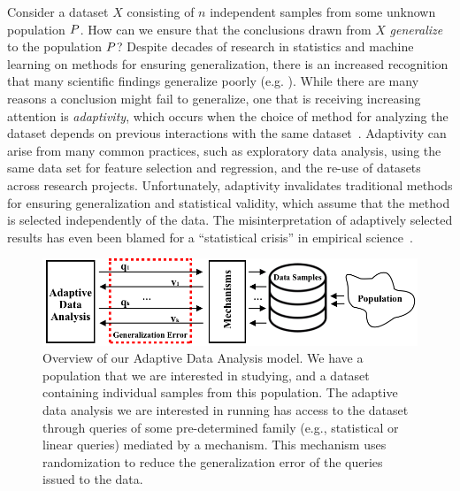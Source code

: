 Consider a dataset $X$ consisting of $n$ independent samples from some unknown population $P$.  How can we ensure that the conclusions drawn from $X$ \emph{generalize} to the population $P$?  Despite decades of research in statistics and machine learning on methods for ensuring generalization, there is an increased recognition that many scientific findings generalize poorly (e.g. 
\cite{Ioannidis05,GelmanL13}). While there are many reasons a conclusion might fail to generalize, one that is receiving increasing attention is \emph{adaptivity}, which occurs when the choice of method for analyzing the dataset depends on previous interactions with the same dataset~\cite{GelmanL13}.
%
 Adaptivity can arise from many common practices, such as exploratory data analysis, using the same data set for feature selection and regression, and the re-use of datasets across research projects.  Unfortunately, adaptivity invalidates traditional methods for ensuring generalization and statistical validity, which assume that the method is selected independently of the data. The misinterpretation of adaptively selected results has even been blamed for a ``statistical crisis'' in empirical science~\cite{GelmanL13}.

\begin{figure}
    \centering
    \includegraphics[width=0.7\columnwidth]{overview.png}
    \caption{Overview of our Adaptive Data Analysis model. We have a population that we are interested in studying, and a dataset containing individual samples from this population. The adaptive data analysis we are interested in running has access to the dataset through queries of some pre-determined family (e.g., statistical or linear queries) mediated by a mechanism. This mechanism uses randomization to reduce the generalization error of the queries issued to the data.}
    \label{fig:adaptivity-model-overview}
\vspace{-0.5cm}
\end{figure}


